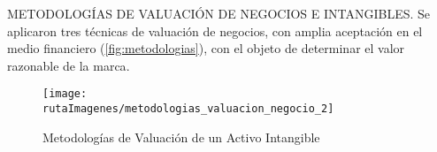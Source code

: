 \textcolor{secundario}{METODOLOG\'IAS DE VALUACI\'ON DE NEGOCIOS E INTANGIBLES}. Se aplicaron \textcolor{secundario}{tres t\'ecnicas de valuaci\'on de negocios}, con amplia aceptaci\'on en el medio financiero (\autoref{fig:metodologias}), con el objeto de determinar el \textcolor{secundario}{valor razonable de la marca}.\\

\begin{figure}[H]
\centering
\caption{Metodolog\'ias de Valuaci\'on de un Activo Intangible\label{fig:metodologias}}
\texttt{[image: \\rutaImagenes/metodologias\_valuacion\_negocio\_2]}\\

\end{figure}

%
%
